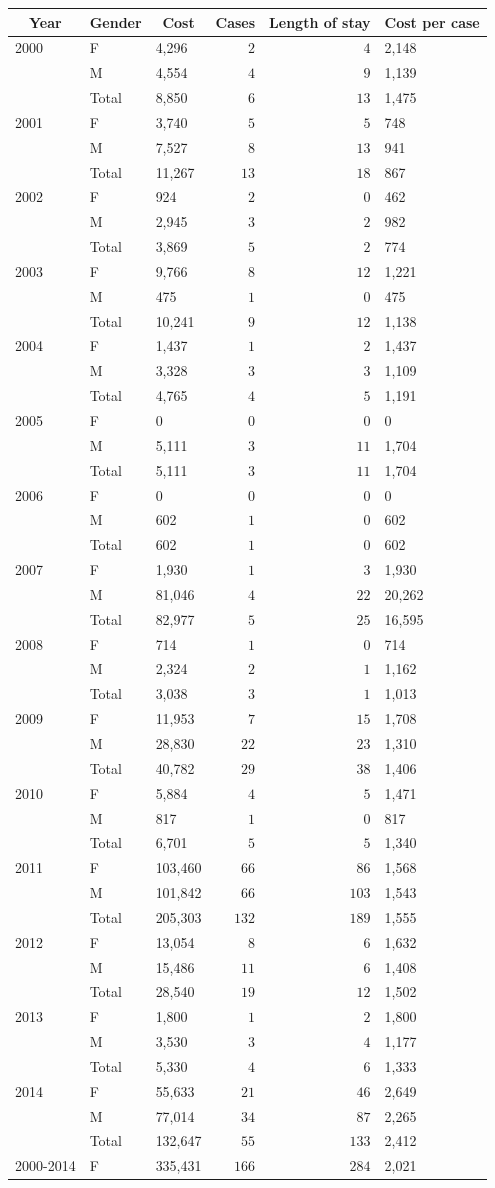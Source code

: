 \documentclass{article}
\begin{document}
\begin{table}\footnotesize
\begin{center}
\begin{tabular}{lllrrl}
\hline\hline
\multicolumn{1}{c}{Year}&\multicolumn{1}{c}{Gender}&\multicolumn{1}{c}{Cost}&\multicolumn{1}{c}{Cases}&\multicolumn{1}{c}{Length of stay}&\multicolumn{1}{c}{Cost per case}\tabularnewline
\hline
2000&F&4,296&$  2$&$  4$&2,148\tabularnewline
&M&4,554&$  4$&$  9$&1,139\tabularnewline
&Total&8,850&$  6$&$ 13$&1,475\tabularnewline
2001&F&3,740&$  5$&$  5$&748\tabularnewline
&M&7,527&$  8$&$ 13$&941\tabularnewline
&Total&11,267&$ 13$&$ 18$&867\tabularnewline
2002&F&924&$  2$&$  0$&462\tabularnewline
&M&2,945&$  3$&$  2$&982\tabularnewline
&Total&3,869&$  5$&$  2$&774\tabularnewline
2003&F&9,766&$  8$&$ 12$&1,221\tabularnewline
&M&475&$  1$&$  0$&475\tabularnewline
&Total&10,241&$  9$&$ 12$&1,138\tabularnewline
2004&F&1,437&$  1$&$  2$&1,437\tabularnewline
&M&3,328&$  3$&$  3$&1,109\tabularnewline
&Total&4,765&$  4$&$  5$&1,191\tabularnewline
2005&F&0&$  0$&$  0$&0\tabularnewline
&M&5,111&$  3$&$ 11$&1,704\tabularnewline
&Total&5,111&$  3$&$ 11$&1,704\tabularnewline
2006&F&0&$  0$&$  0$&0\tabularnewline
&M&602&$  1$&$  0$&602\tabularnewline
&Total&602&$  1$&$  0$&602\tabularnewline
2007&F&1,930&$  1$&$  3$&1,930\tabularnewline
&M&81,046&$  4$&$ 22$&20,262\tabularnewline
&Total&82,977&$  5$&$ 25$&16,595\tabularnewline
2008&F&714&$  1$&$  0$&714\tabularnewline
&M&2,324&$  2$&$  1$&1,162\tabularnewline
                    &Total&3,038&$  3$&$  1$&1,013\tabularnewline
2009&F&11,953&$  7$&$ 15$&1,708\tabularnewline
&M&28,830&$ 22$&$ 23$&1,310\tabularnewline
                    &Total&40,782&$ 29$&$ 38$&1,406\tabularnewline
2010&F&5,884&$  4$&$  5$&1,471\tabularnewline
&M&817&$  1$&$  0$&817\tabularnewline
                    &Total&6,701&$  5$&$  5$&1,340\tabularnewline
2011&F&103,460&$ 66$&$ 86$&1,568\tabularnewline
&M&101,842&$ 66$&$103$&1,543\tabularnewline
                    &Total&205,303&$132$&$189$&1,555\tabularnewline
2012&F&13,054&$  8$&$  6$&1,632\tabularnewline
&M&15,486&$ 11$&$  6$&1,408\tabularnewline
                    &Total&28,540&$ 19$&$ 12$&1,502\tabularnewline
2013&F&1,800&$  1$&$  2$&1,800\tabularnewline
&M&3,530&$  3$&$  4$&1,177\tabularnewline
                    &Total&5,330&$  4$&$  6$&1,333\tabularnewline
2014&F&55,633&$ 21$&$ 46$&2,649\tabularnewline
&M&77,014&$ 34$&$ 87$&2,265\tabularnewline
&Total&132,647&$ 55$&$133$&2,412\tabularnewline
2000-2014&      F&335,431&$166$&$284$&2,021\tabularnewline

\end{tabular}
\end{center}
\end{table}
\end{document}
